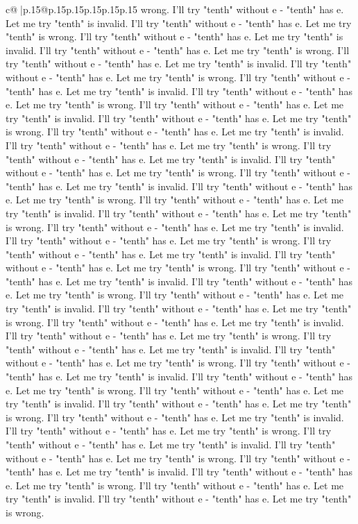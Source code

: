 \documentclass{article}
\begin{document}
{\begin{supertabular}{c@{$\;$}|p{.15\linewidth}@{}p{.15\linewidth}p{.15\linewidth}p{.15\linewidth}p{.15\linewidth}p{.15\linewidth}}
{{{wrong. I'll try "tenth" without e {-} "tenth" has e. Let me try "tenth" is invalid. I'll try "tenth" without e {-} "tenth" has e. Let me try "tenth" is wrong. I'll try "tenth" without e {-} "tenth" has e. Let me try "tenth" is invalid. I'll try "tenth" without e {-} "tenth" has e. Let me try "tenth" is wrong. I'll try "tenth" without e {-} "tenth" has e. Let me try "tenth" is invalid. I'll try "tenth" without e {-} "tenth" has e. Let me try "tenth" is wrong. I'll try "tenth" without e {-} "tenth" has e. Let me try "tenth" is invalid. I'll try "tenth" without e {-} "tenth" has e. Let me try "tenth" is wrong. I'll try "tenth" without e {-} "tenth" has e. Let me try "tenth" is invalid. I'll try "tenth" without e {-} "tenth" has e. Let me try "tenth" is wrong. I'll try "tenth" without e {-} "tenth" has e. Let me try "tenth" is invalid. I'll try "tenth" without e {-} "tenth" has e. Let me try "tenth" is wrong. I'll try "tenth" without e {-} "tenth" has e. Let me try "tenth" is invalid. I'll try "tenth" without e {-} "tenth" has e. Let me try "tenth" is wrong. I'll try "tenth" without e {-} "tenth" has e. Let me try "tenth" is invalid. I'll try "tenth" without e {-} "tenth" has e. Let me try "tenth" is wrong. I'll try "tenth" without e {-} "tenth" has e. Let me try "tenth" is invalid. I'll try "tenth" without e {-} "tenth" has e. Let me try "tenth" is wrong. I'll try "tenth" without e {-} "tenth" has e. Let me try "tenth" is invalid. I'll try "tenth" without e {-} "tenth" has e. Let me try "tenth" is wrong. I'll try "tenth" without e {-} "tenth" has e. Let me try "tenth" is invalid. I'll try "tenth" without e {-} "tenth" has e. Let me try "tenth" is wrong. I'll try "tenth" without e {-} "tenth" has e. Let me try "tenth" is invalid. I'll try "tenth" without e {-} "tenth" has e. Let me try "tenth" is wrong. I'll try "tenth" without e {-} "tenth" has e. Let me try "tenth" is invalid. I'll try "tenth" without e {-} "tenth" has e. Let me try "tenth" is wrong. I'll try "tenth" without e {-} "tenth" has e. Let me try "tenth" is invalid. I'll try "tenth" without e {-} "tenth" has e. Let me try "tenth" is wrong. I'll try "tenth" without e {-} "tenth" has e. Let me try "tenth" is invalid. I'll try "tenth" without e {-} "tenth" has e. Let me try "tenth" is wrong. I'll try "tenth" without e {-} "tenth" has e. Let me try "tenth" is invalid. I'll try "tenth" without e {-} "tenth" has e. Let me try "tenth" is wrong. I'll try "tenth" without e {-} "tenth" has e. Let me try "tenth" is invalid. I'll try "tenth" without e {-} "tenth" has e. Let me try "tenth" is wrong. I'll try "tenth" without e {-} "tenth" has e. Let me try "tenth" is invalid. I'll try "tenth" without e {-} "tenth" has e. Let me try "tenth" is wrong. I'll try "tenth" without e {-} "tenth" has e. Let me try "tenth" is invalid. I'll try "tenth" without e {-} "tenth" has e. Let me try "tenth" is wrong. I'll try "tenth" without e {-} "tenth" has e. Let me try "tenth" is invalid. I'll try "tenth" without e {-} "tenth" has e. Let me try "tenth" is wrong. I'll try "tenth" without e {-} "tenth" has e. Let me try "tenth" is invalid. I'll try "tenth" without e {-} "tenth" has e. Let me try "tenth" is wrong. }}}
\end{supertabular}}
\end{document}
